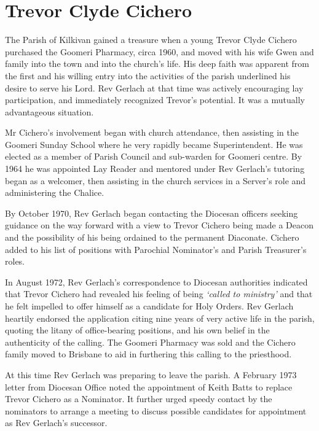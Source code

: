 \hypertarget{trevor-clyde-cichero}{%
\section{Trevor Clyde Cichero}\label{trevor-clyde-cichero}}

The Parish of Kilkivan gained a treasure when a young Trevor Clyde Cichero purchased the Goomeri Pharmacy, circa 1960, and moved with his wife Gwen and family into the town and into the church's life. His deep faith was apparent from the first and his willing entry into the activities of the parish underlined his desire to serve his Lord. Rev Gerlach at that time was actively encouraging lay participation, and immediately recognized Trevor's potential. It was a mutually advantageous situation.

Mr Cichero's involvement began with church attendance, then assisting in the Goomeri Sunday School where he very rapidly became Superintendent. He was elected as a member of Parish Council and sub-warden for Goomeri centre. By 1964 he was appointed Lay Reader and mentored under Rev Gerlach's tutoring began as a welcomer, then assisting in the church services in a Server's role and administering the Chalice.

By October 1970, Rev Gerlach began contacting the Diocesan officers seeking guidance on the way forward with a view to Trevor Cichero being made a Deacon and the possibility of his being ordained to the permanent Diaconate. Cichero added to his list of positions with Parochial Nominator's and Parish Treasurer's roles.

In August 1972, Rev Gerlach's correspondence to Diocesan authorities indicated that Trevor Cichero had revealed his feeling of being \emph{`called to ministry'} and that he felt impelled to offer himself as a candidate for Holy Orders. Rev Gerlach heartily endorsed the application citing nine years of very active life in the parish, quoting the litany of office-bearing positions, and his own belief in the authenticity of the calling. The Goomeri Pharmacy was sold and the Cichero family moved to Brisbane to aid in furthering this calling to the priesthood.

At this time Rev Gerlach was preparing to leave the parish. A February 1973 letter from Diocesan Office noted the appointment of Keith Batts to replace Trevor Cichero as a Nominator. It further urged speedy contact by the nominators to arrange a meeting to discuss possible candidates for appointment as Rev Gerlach's successor.

